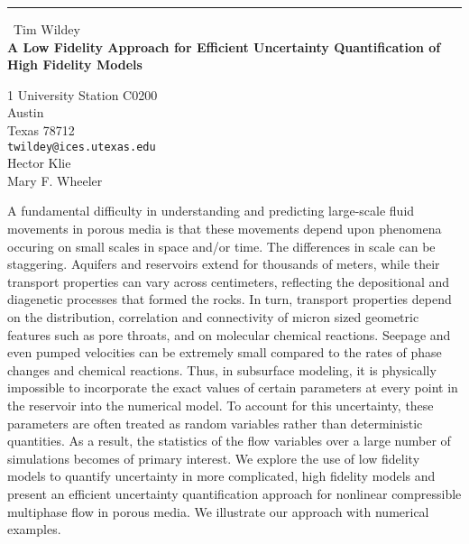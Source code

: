 \documentclass{report}
\begin{document}
\begin{center}
\rule{6in}{1pt} \
{\large Tim Wildey \\
{\bf A Low Fidelity Approach for Efficient Uncertainty Quantification of High Fidelity Models}}

1 University Station C0200 \\ Austin \\ Texas 78712
\\
{\tt twildey@ices.utexas.edu}\\
Hector Klie\\
Mary F. Wheeler\end{center}

A fundamental difficulty in understanding and predicting large-scale
fluid movements in porous media is that these movements depend upon
phenomena occuring on small scales in space and/or time. The differences
in scale can be staggering. Aquifers and reservoirs extend for thousands
of meters, while their transport properties can vary across centimeters,
reflecting the depositional and diagenetic processes that formed the
rocks. In turn, transport properties depend on the distribution,
correlation and connectivity of micron sized geometric features such as
pore throats, and on molecular chemical reactions. Seepage and even
pumped velocities can be extremely small compared to the rates of phase
changes and chemical reactions. Thus, in subsurface modeling, it is
physically impossible to incorporate the exact values of certain
parameters at every point in the reservoir into the numerical model. To
account for this uncertainty, these parameters are often treated as
random variables rather than deterministic quantities. As a result, the
statistics of the flow variables over a large number of simulations
becomes of primary interest. We explore the use of low fidelity models to
quantify uncertainty in more complicated, high fidelity models and
present an efficient uncertainty quantification approach for nonlinear
compressible multiphase flow in porous media. We illustrate our approach
with numerical examples.
\end{document}
